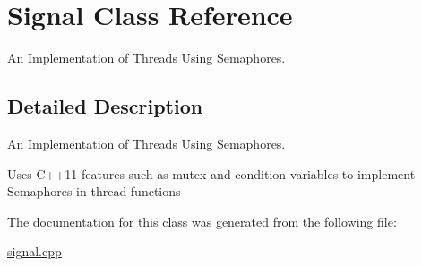 \hypertarget{class_signal}{}\section{Signal Class Reference}
\label{class_signal}


An Implementation of Threads Using Semaphores.  




\subsection{Detailed Description}
An Implementation of Threads Using Semaphores. 

Uses C++11 features such as mutex and condition variables to implement Semaphores in thread functions 

The documentation for this class was generated from the following file\+:\begin{DoxyCompactItemize}
\item 
\hyperlink{signal_8cpp}{signal.\+cpp}\end{DoxyCompactItemize}
